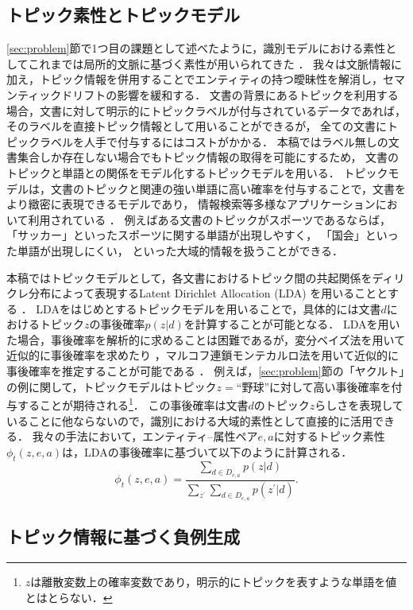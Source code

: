 \documentclass[japanese]{jnlp_1.4}
\begin{document}
\subsection{トピック素性とトピックモデル}
\label{sec:topicfeature}

\ref{sec:problem}節で1つ目の課題として述べたように，識別モデルにおける素性としてこれまでは局所的文脈に基づく素性が用いられてきた \cite{bellare2007lightly}．
我々は文脈情報に加え，トピック情報を併用することでエンティティの持つ曖昧性を解消し，セマンティックドリフトの影響を緩和する．
文書の背景にあるトピックを利用する場合，文書に対して明示的にトピックラベルが付与されているデータであれば，そのラベルを直接トピック情報として用いることができるが，
全ての文書にトピックラベルを人手で付与するにはコストがかかる．
本稿ではラベル無しの文書集合しか存在しない場合でもトピック情報の取得を可能にするため，
文書のトピックと単語との関係をモデル化するトピックモデルを用いる．
トピックモデルは，文書のトピックと関連の強い単語に高い確率を付与することで，文書をより緻密に表現できるモデルであり，
情報検索等多様なアプリケーションにおいて利用されている \cite{hofmann1999probabilistic}．
例えばある文書のトピックがスポーツであるならば，
「サッカー」といったスポーツに関する単語が出現しやすく，
「国会」といった単語が出現しにくい，
といった大域的情報を扱うことができる．

本稿ではトピックモデルとして，各文書におけるトピック間の共起関係をディリクレ分布によって表現するLatent Dirichlet Allocation (LDA) を用いることとする \cite{blei2003latent}．
LDAをはじめとするトピックモデルを用いることで，具体的には文書$d$におけるトピック$z$の事後確率$p(z|d)$を計算することが可能となる．
LDAを用いた場合，事後確率を解析的に求めることは困難であるが，変分ベイズ法を用いて近似的に事後確率を求めたり \cite{blei2003latent}，マルコフ連鎖モンテカルロ法を用いて近似的に事後確率を推定することが可能である \cite{Griffiths2004fst}．
例えば，\ref{sec:problem}節の「ヤクルト」の例に関して，トピックモデルはトピック$z=\text{``野球''}$に対して高い事後確率を付与することが期待される\footnote{$z$は離散変数上の確率変数であり，明示的にトピックを表すような単語を値とはとらない．}．
この事後確率は文書$d$のトピック$z$らしさを表現していることに他ならないので，識別における大域的素性として直接的に活用できる．
我々の手法において，エンティティ--属性ペア$e,a$に対するトピック素性$\phi_t(z,e,a)$は，LDAの事後確率に基づいて以下のように計算される．
\[
\phi_t(z,e,a)=\frac{\sum_{d \in D_{e,a}} p(z|d)}{\sum_{z^\prime }\sum_{d \in D_{e,a}} p(z^\prime |d)}.
\]



\subsection{トピック情報に基づく負例生成}
\label{sec:negative}
\end{document}

